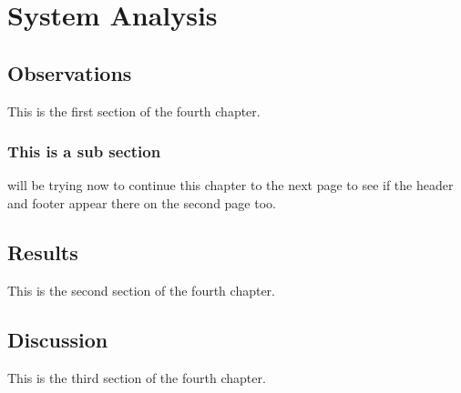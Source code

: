 \chapter{System Analysis} \label{System Analysis}
\section{Observations} \label{Observations}
This is the first section of the fourth chapter.

\subsection{This is a sub section} \label{This is a sub section}
will be trying now to continue this chapter to the next page to see if the header and footer appear there on the second page too.
\section{Results} \label{Results}
This is the second section of the fourth chapter.
\section{Discussion} \label{Discussion}
This is the third section of the fourth chapter.